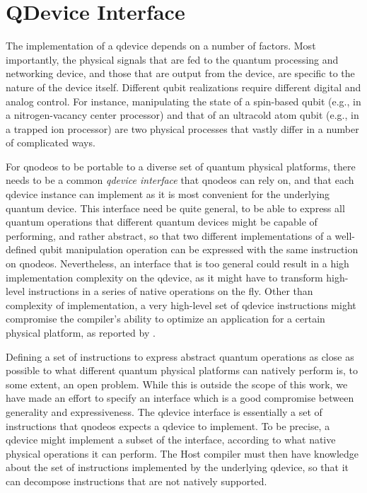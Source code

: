 \chapter{QDevice Interface}
\label{app:qdevice}

The implementation of a \acrshort{qdevice} depends on a number of factors. Most importantly, the
physical signals that are fed to the quantum processing and networking device, and those that are
output from the device, are specific to the nature of the device itself. Different qubit
realizations require different digital and analog control. For instance, manipulating the state of a
spin-based qubit (e.g., in a nitrogen-vacancy center processor) and that of an ultracold atom qubit
(e.g., in a trapped ion processor) are two physical processes that vastly differ in a number of
complicated ways.

For \acrshort{qnodeos} to be portable to a diverse set of quantum physical platforms, there needs to
be a common \emph{\acrshort{qdevice} interface} that \acrshort{qnodeos} can rely on, and that each
\acrshort{qdevice} instance can implement as it is most convenient for the underlying quantum
device. This interface need be quite general, to be able to express all quantum operations that
different quantum devices might be capable of performing, and rather abstract, so that two different
implementations of a well-defined qubit manipulation operation can be expressed with the same
instruction on \acrshort{qnodeos}. Nevertheless, an interface that is too general could result in a
high implementation complexity on the \acrshort{qdevice}, as it might have to transform high-level
instructions in a series of native operations on the fly. Other than complexity of implementation, a
very high-level set of \acrshort{qdevice} instructions might compromise the compiler's ability to
optimize an application for a certain physical platform, as reported by
\textcite{murali_2019_fullstack}.

Defining a set of instructions to express abstract quantum operations as close as possible to what
different quantum physical platforms can natively perform is, to some extent, an open problem. While
this is outside the scope of this work, we have made an effort to specify an interface which is a
good compromise between generality and expressiveness. The \acrshort{qdevice} interface is
essentially a set of instructions that \acrshort{qnodeos} expects a \acrshort{qdevice} to implement.
To be precise, a \acrshort{qdevice} might implement a subset of the interface, according to what
native physical operations it can perform. The Host compiler must then have knowledge about the set
of instructions implemented by the underlying \acrshort{qdevice}, so that it can decompose
instructions that are not natively supported.

